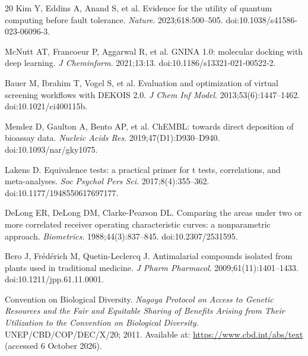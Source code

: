 \documentclass[11pt,a4paper]{article}
\begin{document}
\begin{thebibliography}{20}
Kim Y, Eddins A, Anand S, et al.
Evidence for the utility of quantum computing before fault tolerance.
\textit{Nature}. 2023;618:500--505.
doi:10.1038/s41586-023-06096-3.

McNutt AT, Francoeur P, Aggarwal R, et al.
GNINA 1.0: molecular docking with deep learning.
\textit{J Cheminform}. 2021;13:13.
doi:10.1186/s13321-021-00522-2.

Bauer M, Ibrahim T, Vogel S, et al.
Evaluation and optimization of virtual screening workflows with DEKOIS 2.0.
\textit{J Chem Inf Model}. 2013;53(6):1447--1462.
doi:10.1021/ci400115b.

Mendez D, Gaulton A, Bento AP, et al.
ChEMBL: towards direct deposition of bioassay data.
\textit{Nucleic Acids Res}. 2019;47(D1):D930--D940.
doi:10.1093/nar/gky1075.

Lakens D.
Equivalence tests: a practical primer for t tests, correlations, and meta-analyses.
\textit{Soc Psychol Pers Sci}. 2017;8(4):355--362.
doi:10.1177/1948550617697177.

DeLong ER, DeLong DM, Clarke-Pearson DL.
Comparing the areas under two or more correlated receiver operating characteristic curves: a nonparametric approach.
\textit{Biometrics}. 1988;44(3):837--845.
doi:10.2307/2531595.

Bero J, Fr\'{e}d\'{e}rich M, Quetin-Leclercq J.
Antimalarial compounds isolated from plants used in traditional medicine.
\textit{J Pharm Pharmacol}. 2009;61(11):1401--1433.
doi:10.1211/jpp.61.11.0001.

Convention on Biological Diversity.
\textit{Nagoya Protocol on Access to Genetic Resources and the Fair and Equitable Sharing of Benefits Arising from Their Utilization to the Convention on Biological Diversity}.
UNEP/CBD/COP/DEC/X/20; 2011.
Available at: \url{https://www.cbd.int/abs/text} (accessed 6 October 2026).

\end{thebibliography}
\end{document}
